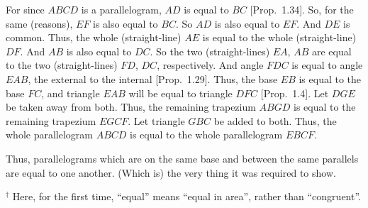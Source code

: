 \begin{Parallel}{}{}
{For since $ABCD$ is a parallelogram, $AD$ is equal to $BC$ [Prop.~1.34].
So, for the same (reasons), $EF$ is also equal to $BC$. So $AD$ is also equal to
$EF$. And $DE$ is common. Thus, the whole (straight-line) $AE$ is equal
to the whole (straight-line) $DF$.  And $AB$ is also equal to $DC$.
So the two (straight-lines) $EA$, $AB$
are equal to the two (straight-lines) $FD$, $DC$, respectively. And angle $FDC$ is
equal to angle $EAB$, the external to the internal [Prop.~1.29]. Thus, the
base $EB$ is equal to the base $FC$, and triangle $EAB$ will be equal to triangle
$DFC$ [Prop.~1.4]. Let $DGE$ be taken away from both. 
Thus, the remaining trapezium $ABGD$ is equal to the remaining trapezium
$EGCF$. Let triangle $GBC$ be added to both. Thus, the whole
parallelogram $ABCD$ is equal to the whole parallelogram $EBCF$.

Thus, parallelograms which are on the same base and between the same
parallels are equal to one another. (Which is) the very thing it was required to
show.}
\end{Parallel}
{\footnotesize \noindent$^\dag$ Here, for the first time, ``equal'' means
``equal in area'', rather than ``congruent''.}

